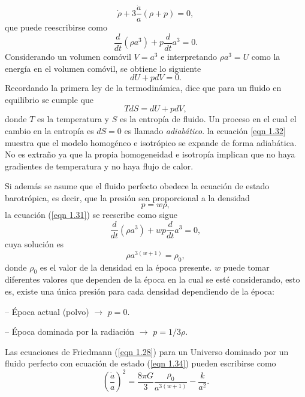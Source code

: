 \documentclass[a4paper,openright,12pt]{book}
\begin{document}
\begin{equation}
\dot{\rho} + 3\frac{\dot{a}}{a}(\rho + p) = 0,\label{eqn 1.30}
\end{equation}
que puede reescribirse como
\begin{equation}
\frac{d}{dt} (\rho a^{3}) + p\frac{d}{dt}a^{3} = 0.\label{eqn 1.31}
\end{equation}
Considerando un volumen comóvil $V = a^{3}$ e interpretando $\rho a^{3} = U$ como la energía en el volumen comóvil, se obtiene lo siguiente
\begin{equation}
dU + pdV = 0. \label{eqn 1.32}
\end{equation}
Recordando la primera ley de la termodinámica, dice que para un fluido en equilibrio se cumple que 
\begin{equation}
TdS = dU +pdV, \label{eqn 1.33}
\end{equation}
donde $T$ es la temperatura y $S$ es la entropía de fluido. Un proceso en el cual el cambio en la entropía es $dS = 0$ es llamado \textit{adiabático}. la ecuación \ref{eqn 1.32} muestra que el modelo homogéneo e isotrópico se expande de forma adiabática. No es extraño ya que la propia homogeneidad e isotropía implican que no haya gradientes de temperatura y no haya flujo de calor.

Si además se asume que el fluido perfecto obedece la ecuación de estado barotrópica, es decir, que la presión sea proporcional a la densidad
\begin{equation}
p = w\rho, \label{eqn 1.34}
\end{equation}
la ecuación (\ref{eqn 1.31}) se reescribe como sigue
\begin{equation}
\frac{d}{dt}(\rho a^{3}) + w p \frac{d}{dt} a^{3} = 0,\label{eqn 1.35}
\end{equation}
cuya solución es
\begin{equation}
\rho a^{3(w + 1)} = \rho _{0}, \label{eqn 1.36}
\end{equation}
donde $\rho _{0}$ es el valor de la densidad en la época presente. $w$ puede tomar diferentes valores que dependen de la época en la cual se esté considerando, esto es, existe una única presión para cada densidad dependiendo de la época:

-- Época actual (polvo) $\rightarrow$ $p=0$.

-- Época dominada por la radiación $\rightarrow$ $p = 1/3 \rho$.

Las ecuaciones de Friedmann (\ref{eqn 1.28}) para un Universo dominado por un fluido perfecto con ecuación de estado (\ref{eqn 1.34}) pueden escribirse como
\begin{equation}
\left(\frac{\dot{a}}{a}\right)^{2}
=
\frac{8 \pi G}{3} \frac{\rho _{0}}{a^{3(w + 1)}} - \frac{k}{a^{2}}.\label{eqn 1.37}
\end{equation}
\end{document}
